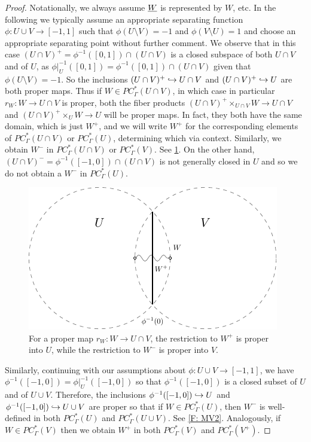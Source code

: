 \begin{proof}
Notationally, we always assume  $\underline{W}$ is represented by $W$, etc.
In the following we typically assume an appropriate separating function $\phi:U\cup V\to [-1,1]$ such that $\phi(U\setminus V)=-1$ and $\phi(V\setminus U)=1$ and choose an appropriate separating point without further comment. We observe that in this case $(U\cap V)^+=\phi^{-1}([0,1])\cap(U\cap V)$ is a closed subspace of both $U\cap V$ and of $U$, as $\phi|_U^{-1}([0,1])=\phi^{-1}([0,1])\cap (U\cap V)$ given that $\phi(U\setminus V)=-1$. So the inclusions $(U\cap V)^+\hookrightarrow U\cap V$ and $(U\cap V)^+\hookrightarrow U$ are both proper maps. Thus if $W\in PC^*_\Gamma(U\cap V)$, in which case in particular $r_W \colon W \to U\cap V$ is proper, both the fiber products $(U\cap V)^+\times_{U\cap V} W\to U\cap V$ and $(U\cap V)^+\times_{U} W\to U$ will be proper maps. In fact, they both have the same domain, which is just $W^+$, and we will write $W^+$ for the corresponding elements of $PC^*_\Gamma(U\cap V)$ or  $PC^*_\Gamma(U)$, determining which via context. Similarly, we obtain $W^-$ in $PC^*_\Gamma(U\cap V)$ or  $PC^*_\Gamma(V)$. See \cref{F: MV1}. On the other hand, $(U\cap V)^-=\phi^{-1}([-1,0])\cap(U\cap V)$ is not generally closed in $U$ and so we do not obtain a $W^-$ in $PC^*_\Gamma(U)$.

\begin{figure}[h]
	\includegraphics[scale=1]{figures/mayer_vietoris1.pdf}
	\caption{For a proper map $r_W \colon W \to U\cap V$, the restriction to $W^+$ is proper into $U$, while the restriction to $W^-$ is proper into $V$. }
\label{F: MV1}
\end{figure}




Similarly, continuing with our assumptions about $\phi:U\cup V\to [-1,1]$,  we have $\phi^{-1}([-1,0])= \phi|_U^{-1}([-1,0])$ so that $\phi^{-1}([-1,0])$ is a closed subset of $U$ and of $U\cup V$. Therefore, the inclusions $\phi^{-1}([-1,0])\hookrightarrow U$ and $\phi^{-1}([-1,0])\hookrightarrow U\cup V$ are proper so that if $W\in PC^*_\Gamma(U)$, then $W^-$ is well-defined in both $PC^*_\Gamma(U)$ and $PC^*_\Gamma(U\cup V)$. See \cref{F: MV2}. Analogously, if $W\in PC^*_\Gamma(V)$ then we obtain $W^+$ in both $PC^*_\Gamma(V)$ and $PC^*_\Gamma(V^+)$.



\end{proof}
